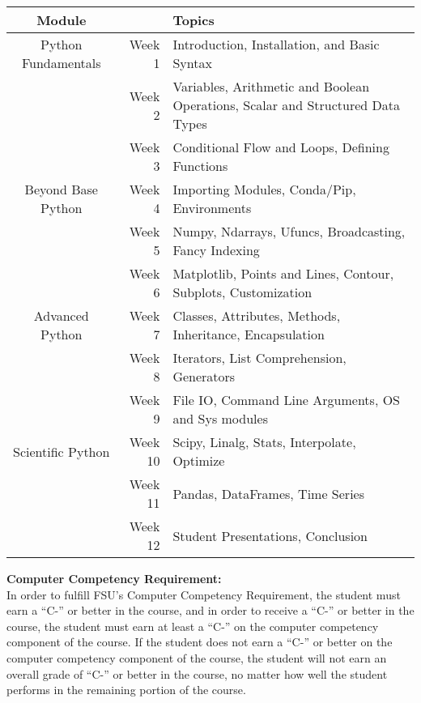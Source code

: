\documentclass[11pt]{article}
\begin{document}
\begin{table}[h!]
\normalsize %
\begin{center}
{\renewcommand{\arraystretch}{1.5}
    \begin{tabular}{crp{8cm}}
    \toprule
    Module &  & Topics \\
    \hline
    Python Fundamentals & Week 1 & Introduction, Installation, and Basic Syntax \\
                        & Week 2 & Variables, Arithmetic and Boolean Operations, Scalar and Structured Data Types \\
                        & Week 3 & Conditional Flow and Loops, Defining Functions \\
    Beyond Base Python  & Week 4 & Importing Modules, Conda/Pip, Environments \\
                        & Week 5 & Numpy, Ndarrays, Ufuncs, Broadcasting, Fancy Indexing \\
                        & Week 6 & Matplotlib, Points and Lines, Contour, Subplots, Customization\\
    Advanced Python     & Week 7 & Classes, Attributes, Methods, Inheritance, Encapsulation\\
                        & Week 8 & Iterators, List Comprehension, Generators\\
                        & Week 9 & File IO, Command Line Arguments, OS and Sys modules\\
    Scientific Python   & Week 10& Scipy, Linalg, Stats, Interpolate, Optimize\\
                        & Week 11& Pandas, DataFrames, Time Series\\
                        & Week 12& Student Presentations, Conclusion
    \end{tabular}
}
\end{center}
\end{table}

\newpage

\textbf{\large Computer Competency Requirement:}\\
In order to fulfill FSU’s Computer Competency Requirement, the student must earn a “C-” or better in the
course, and in order to receive a “C-” or better in the course, the student must earn at least a “C-” on the
computer competency component of the course. If the student does not earn a “C-” or better on the computer
competency component of the course, the student will not earn an overall grade of “C-” or better in the course,
no matter how well the student performs in the remaining portion of the course.\\
\end{document}
